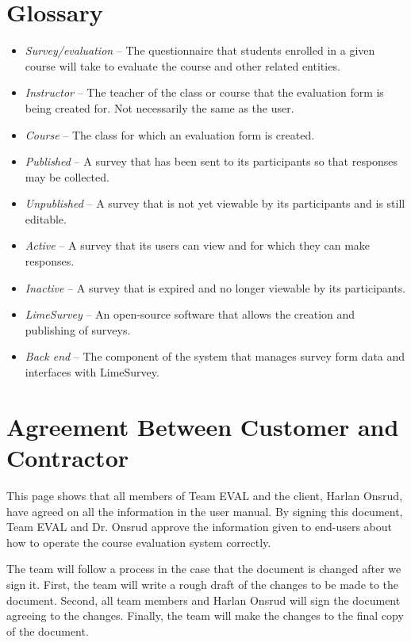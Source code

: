 \documentclass{article}
\begin{document}
\appendix

\newpage

\section{Glossary}

\begin{itemize}
 \item \textit{Survey/evaluation} -- The questionnaire that students enrolled in a given course will take to evaluate the course and other related entities.
 \item \textit{Instructor} -- The teacher of the class or course that the evaluation form is being created for. Not necessarily the same as the user.
 \item \textit{Course} -- The class for which an evaluation form is created.
 \item \textit{Published} -- A survey that has been sent to its participants so that responses may be collected.
 \item \textit{Unpublished} -- A survey that is not yet viewable by its participants and is still editable.
 \item \textit{Active} -- A survey that its users can view and for which they can make responses.
 \item \textit{Inactive} -- A survey that is expired and no longer viewable by its participants.
 \item \textit{LimeSurvey} -- An open-source software that allows the creation and publishing of surveys.
 \item \textit{Back end} -- The component of the system that manages survey form data and interfaces with LimeSurvey.
\end{itemize}

\newpage
\section{Agreement Between Customer and Contractor}

This page shows that all members of Team EVAL and the client, Harlan Onsrud, have agreed on all the information in the user manual. By signing this document, Team EVAL and Dr. Onsrud approve the information given to end-users about how to operate the course evaluation system correctly.

The team will follow a process in the case that the document is changed after we sign it. First, the team will write a rough draft of the changes to be made to the document. Second, all team members and Harlan Onsrud will sign the document agreeing to the changes. Finally, the team will make the changes to the final copy of the document.
\end{document}
